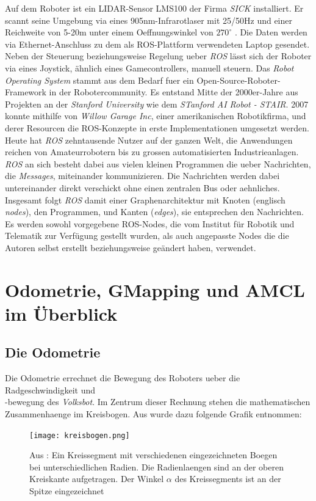 \documentclass[11pt,a4paper]{article}
\begin{document}
Auf dem Roboter ist ein LIDAR-Sensor LMS100 der Firma \textit{SICK} installiert. Er scannt seine Umgebung via eines 905nm-Infrarotlaser 
mit 25/50Hz und einer Reichweite von 5-20m unter einem Oeffnungswinkel von $270^\circ$ \cite{website:LMS100}. Die Daten werden via Ethernet-Anschluss zu dem als ROS-Plattform verwendeten
Laptop gesendet. Neben der Steuerung beziehungsweise Regelung ueber \textit{ROS} lässt sich der Roboter via eines Joystick, ähnlich eines Gamecontrollers, manuell steuern.
Das \textit{Robot Operating System}  stammt aus dem Bedarf fuer ein Open-Source-Roboter-Framework in der Robotercommunity.
Es entstand Mitte der 2000er-Jahre aus Projekten an der \textit{Stanford University} wie dem \textit{STanford AI Robot - STAIR}.
2007 konnte mithilfe von \textit{Willow Garage Inc}, einer amerikanischen Robotikfirma, und derer
Resourcen die ROS-Konzepte in erste Implementationen umgesetzt werden. Heute hat \textit{ROS} zehntausende Nutzer auf der ganzen Welt,
die Anwendungen reichen von Amateurrobotern bis zu grossen automatisierten Industrieanlagen. 
\textit{ROS} an sich besteht dabei aus vielen kleinen Programmen die ueber Nachrichten, die \textit{Messages}, miteinander kommunizieren.
Die Nachrichten werden dabei untereinander direkt verschickt ohne einen zentralen Bus oder aehnliches. Insgesamt
folgt \textit{ROS} damit einer Graphenarchitektur mit Knoten (englisch \textit{nodes}), den Programmen, und Kanten (\textit{edges}), sie entsprechen den Nachrichten. \cite{quigley2015programming}
Es werden sowohl vorgegebene ROS-Nodes, die vom Institut für Robotik und Telematik zur Verfügung gestellt wurden, als auch angepasste Nodes die die Autoren selbst erstellt beziehungsweise
geändert haben, verwendet. 
\section{Odometrie, GMapping und AMCL im Überblick}
\subsection*{Die Odometrie}
Die Odometrie errechnet die Bewegung des Roboters ueber die Radgeschwindigkeit und \\ -bewegung 
des \textit{Volksbot}. Im Zentrum dieser Rechnung stehen die mathematischen Zusammenhaenge im Kreisbogen. 
Aus \cite{website:dresden} wurde dazu folgende Grafik entnommen:

\begin{figure}[ht]
  \centering
  \texttt{[image: kreisbogen.png]}
  \caption{Aus \cite{website:dresden}: Ein Kreissegment mit verschiedenen eingezeichneten Boegen bei unterschiedlichen Radien. Die Radienlaengen sind an der oberen Kreiskante 
  aufgetragen. Der Winkel $\alpha$ des Kreissegments ist an der Spitze eingezeichnet}
  \label{fig: Kreissegment}
\end{figure}
\end{document}
